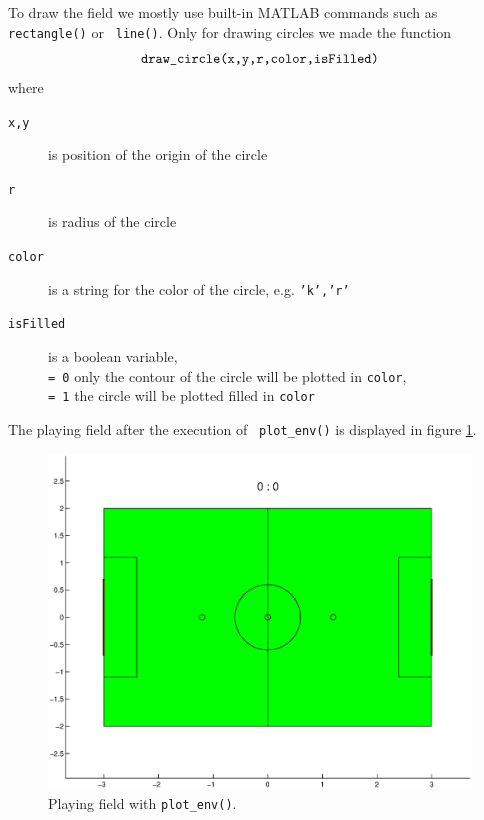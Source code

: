 To draw the field we mostly use built-in MATLAB commands such as \texttt{ rectangle()} or \texttt{ line()}. Only for drawing circles we made the function
	\[ \textnormal{\texttt{draw\_circle(x,y,r,color,isFilled)}}
	\]
where
\begin{description}
	\item[\texttt{x,y}] is position of the origin of the circle
	\item[\texttt{r}] is radius of the circle
	\item[\texttt{color}] is a string for the color of the circle, e.g. \texttt{'k','r'}
	\item[\texttt{isFilled}] is a boolean variable,\\
	\texttt{= 0} only the contour of the circle will be plotted in \texttt{color},\\
	\texttt{= 1} the circle will be plotted filled in \texttt{color}
\end{description}

The playing field after the execution of \texttt{ plot\_env()} is displayed in figure \ref{Playing_field}.

\begin{figure}[h]
	\centering
    	\includegraphics[width=12cm]{./2_Simulation/playing_field}
  	\caption{Playing field with \texttt{plot\_env()}.}
  	\label{Playing_field}
\end{figure}
\pagebreak[4]

